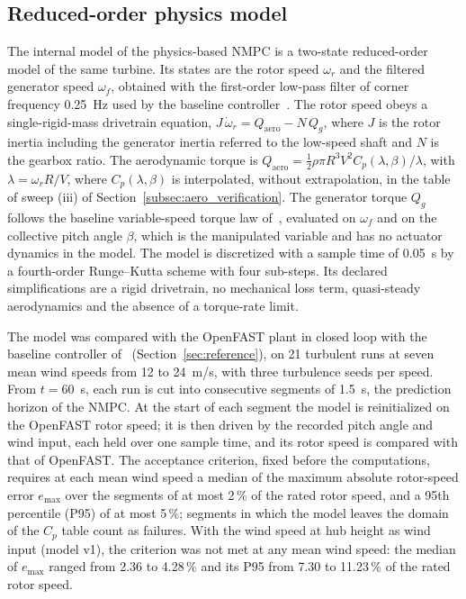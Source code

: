 \subsection{Reduced-order physics model}
\label{subsec:rom}
{\color{revQ1}
The internal model of the physics-based NMPC is a two-state reduced-order model of the same turbine. Its states are the rotor speed $\omega_r$ and the filtered generator speed $\omega_f$, obtained with the first-order low-pass filter of corner frequency 0.25~Hz used by the baseline controller~\cite{jonkman2009}. The rotor speed obeys a single-rigid-mass drivetrain equation, $J\,\dot{\omega}_r = Q_\mathrm{aero} - N\,Q_g$, where $J$ is the rotor inertia including the generator inertia referred to the low-speed shaft and $N$ is the gearbox ratio. The aerodynamic torque is $Q_\mathrm{aero} = \tfrac{1}{2}\rho\pi R^3 V^2 C_p(\lambda,\beta)/\lambda$, with $\lambda = \omega_r R/V$, where $C_p(\lambda,\beta)$ is interpolated, without extrapolation, in the table of sweep (iii) of Section~\ref{subsec:aero_verification}. The generator torque $Q_g$ follows the baseline variable-speed torque law of~\cite{jonkman2009}, evaluated on $\omega_f$ and on the collective pitch angle $\beta$, which is the manipulated variable and has no actuator dynamics in the model. The model is discretized with a sample time of 0.05~s by a fourth-order Runge--Kutta scheme with four sub-steps. Its declared simplifications are a rigid drivetrain, no mechanical loss term, quasi-steady aerodynamics and the absence of a torque-rate limit.

The model was compared with the OpenFAST plant in closed loop with the baseline controller of~\cite{jonkman2009} (Section~\ref{sec:reference}), on 21 turbulent runs at seven mean wind speeds from 12 to 24~m/s, with three turbulence seeds per speed. From $t = 60$~s, each run is cut into consecutive segments of 1.5~s, the prediction horizon of the NMPC. At the start of each segment the model is reinitialized on the OpenFAST rotor speed; it is then driven by the recorded pitch angle and wind input, each held over one sample time, and its rotor speed is compared with that of OpenFAST. The acceptance criterion, fixed before the computations, requires at each mean wind speed a median of the maximum absolute rotor-speed error $e_{\max}$ over the segments of at most 2\,\% of the rated rotor speed, and a 95th percentile (P95) of at most 5\,\%; segments in which the model leaves the domain of the $C_p$ table count as failures. With the wind speed at hub height as wind input (model v1), the criterion was not met at any mean wind speed: the median of $e_{\max}$ ranged from 2.36 to 4.28\,\% and its P95 from 7.30 to 11.23\,\% of the rated rotor speed.

}
